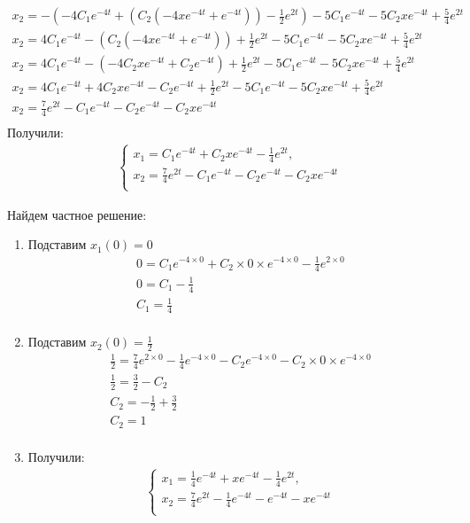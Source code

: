 \begin{gather*}
	x_2 = -(-4C_1e^{-4t} + (C_2(-4xe^{-4t} + e^{-4t})) -\frac{1}{2}e^{2t}) - 5C_1e^{-4t} - 5C_2xe^{-4t} + \frac{5}{4}e^{2t} \\
	x_2 = 4C_1e^{-4t} - (C_2(-4xe^{-4t} + e^{-4t})) +\frac{1}{2}e^{2t} - 5C_1e^{-4t} - 5C_2xe^{-4t} + \frac{5}{4}e^{2t} \\
	x_2 = 4C_1e^{-4t} - (-4C_2xe^{-4t} + C_2e^{-4t}) +\frac{1}{2}e^{2t} - 5C_1e^{-4t} - 5C_2xe^{-4t} + \frac{5}{4}e^{2t} \\
	x_2 = 4C_1e^{-4t} + 4C_2xe^{-4t} - C_2e^{-4t} + \frac{1}{2}e^{2t} - 5C_1e^{-4t} - 5C_2xe^{-4t} + \frac{5}{4}e^{2t} \\
	x_2 = \frac{7}{4}e^{2t} - C_1e^{-4t} - C_2e^{-4t} - C_2xe^{-4t} \\
\end{gather*}
Получили:
\begin{gather*}
	\begin{cases}
		x_1 = C_1e^{-4t} + C_2xe^{-4t} -\frac{1}{4}e^{2t},              \\
		x_2 = \frac{7}{4}e^{2t} - C_1e^{-4t} - C_2e^{-4t} - C_2xe^{-4t} \\
	\end{cases}
\end{gather*}

Найдем частное решение:
\begin{enumerate}
	\item Подставим $x_1(0) = 0$ \\
	      \begin{gather*}
		      0 = C_1e^{-4 \times 0} + C_2 \times 0 \times e^{-4 \times 0} -\frac{1}{4}e^{2 \times 0} \\
		      0 = C_1 - \frac{1}{4} \\
		      C_1 = \frac{1}{4} \\
	      \end{gather*}
	\item Подставим $x_2(0) = \frac{1}{2}$ \\
	      \begin{gather*}
		      \frac{1}{2} = \frac{7}{4}e^{2 \times 0} - \frac{1}{4}e^{-4 \times 0} - C_2e^{-4 \times 0} - C_2\times 0 \times e^{-4 \times 0} \\
		      \frac{1}{2} = \frac{3}{2} - C_2 \\
		      C_2 = -\frac{1}{2} + \frac{3}{2} \\
		      C_2 = 1 \\
	      \end{gather*}
	\item Получили:
	      \begin{gather*}
		      \begin{cases}
			      x_1 = \frac{1}{4}e^{-4t} + xe^{-4t} -\frac{1}{4}e^{2t},          \\
			      x_2 = \frac{7}{4}e^{2t} - \frac{1}{4}e^{-4t} -e^{-4t} - xe^{-4t} \\
		      \end{cases}
	      \end{gather*}
\end{enumerate}
